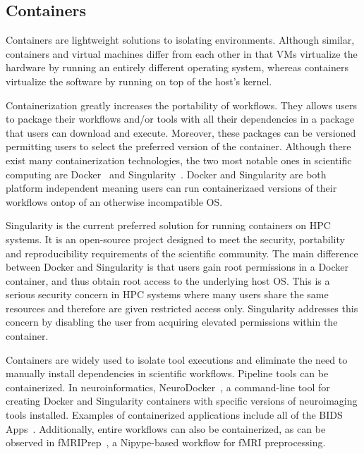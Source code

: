        \subsection{Containers}

            Containers are lightweight solutions to isolating 
            environments. Although similar, containers and virtual machines 
            differ from each 
            other in that VMs virtualize the
            hardware by running an entirely different operating system, whereas
            containers virtualize the software by running on top of the host's
            kernel. 
        
            Containerization greatly increases the portability of workflows. 
            They allows users to package their workflows and/or tools with all 
            their dependencies in a package that users can download and 
            execute. Moreover, these packages can be versioned permitting users 
            to select the preferred version of the container. Although there 
            exist many containerization technologies, the two most notable ones
            in scientific computing are Docker~\cite{merkel2014docker} and 
            Singularity~\cite{10.1371/journal.pone.0177459}. Docker and 
            Singularity are both platform independent meaning users can run
            containerizaed versions of their workflows ontop of an otherwise
            incompatible OS.

            Singularity is the current preferred solution for running 
            containers on HPC systems. It is an open-source project designed to
            meet the security, portability and reproducibility requirements of 
            the scientific community. The main difference between Docker and 
            Singularity is that users gain root permissions in a Docker 
            container, and thus obtain root access to the underlying host OS. 
            This is a serious security concern in HPC systems where many users
            share the same resources and therefore are given restricted access
            only. Singularity addresses this concern by disabling the user from
            acquiring elevated permissions within the container. 

            Containers are widely used to isolate tool executions and eliminate
            the need to manually install dependencies in scientific workflows.
            Pipeline tools can be containerized. In neuroinformatics, 
            NeuroDocker~\cite{neurodoc}, a command-line tool for creating Docker and 
            Singularity containers with specific versions of neuroimaging tools
            installed. Examples of 
            containerized applications include all of the BIDS Apps~\cite{10.1371/journal.pcbi.1005209}. 
            Additionally, entire workflows can also be containerized, as can be
            observed in fMRIPrep~\cite{Esteban306951}, a Nipype-based workflow for fMRI 
            preprocessing.
            
